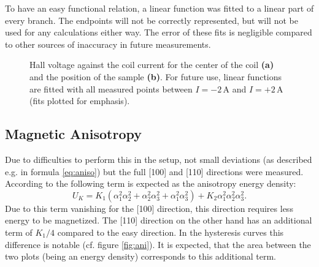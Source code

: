 \documentclass[a4paper]{scrartcl}
\numberwithin{equation}{section}
\numberwithin{figure}{section}
\numberwithin{table}{section}
\newcommand{\eq}[2]{\begin{equation}#1\label{#2}\end{equation}}
\begin{document}
To have an easy functional relation, a linear function was fitted to a linear part of every branch. The endpoints will not be correctly represented, but will not be used for any calculations either way. The error of these fits is negligible compared to other sources of inaccuracy in future measurements.
\begin{figure} 
 \centering
{}

\caption{
\small Hall voltage against the coil current for the center of the coil \textbf{(a)} and the position of the sample \textbf{(b)}. For future use, linear functions are fitted with all measured points between $I=-2\,\text{A}$ and $I=+2\,\text{A}$ (fits plotted for emphasis). } 
	\label{fig:cali}
\end{figure}


\subsection{Magnetic Anisotropy}
Due to difficulties to perform this in the setup, not small deviations (as described e.g. in formula \ref{eq:aniso}) but the full [100] and [110] directions were measured. According to \cite{kittel} the following term is expected as the anisotropy energy density:
\eq{U_K=K_1(\alpha_1^2\alpha_2^2 + \alpha_2^2\alpha_3^2 + \alpha_1^2\alpha_3^2) + K_2\alpha_1^2\alpha_2^2\alpha_3^2 .}{}
Due to this term vanishing for the [100] direction, this direction requires less energy to be magnetized. The [110] direction on the other hand has an additional term of $K_1 / 4$ compared to the easy direction. In the hysteresis curves this difference is notable (cf. figure \ref{fig:ani}). It is expected, that the area between the two plots (being an energy density) corresponds to this additional term.
\end{document}
